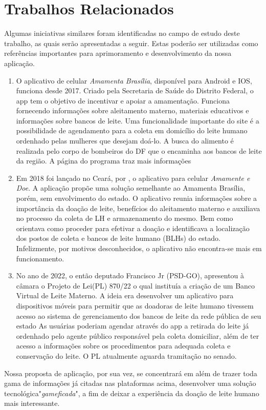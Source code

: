 \chapter{Trabalhos Relacionados}

Algumas iniciativas similares foram identificadas no campo de estudo deste trabalho, as quais serão apresentadas a seguir. Estas poderão ser utilizadas como referências importantes para aprimoramento e desenvolvimento da nossa aplicação.\\
\begin{enumerate}
    \item O aplicativo de celular \emph{Amamenta Brasília}, disponível para Android e IOS, funciona desde 2017. Criado pela Secretaria de Saúde do Distrito Federal, o app tem o objetivo de incentivar e apoiar a amamentação. Funciona fornecendo informações sobre aleitamento materno, materiais educativos e informações sobre bancos de leite. Uma funcionalidade importante do site é a possibilidade de agendamento para a coleta em domicílio do leite humano ordenhado pelas mulheres que desejam doá-lo. A busca do alimento é realizada pelo corpo de bombeiros do DF que o encaminha aos bancos de leite da região. A página do programa \cite{amamentabrasilia} traz mais informações
    \item Em 2018 foi lançado no Ceará, por  \cite{Carvalho}, o aplicativo para celular \emph{Amamente e Doe}. A aplicação propõe uma solução semelhante ao Amamenta Brasília, porém, sem envolvimento do estado. O aplicativo reunia informações sobre a importância da doação de leite, benefícios do aleitamento materno e auxiliava no processo da coleta de LH e armazenamento do mesmo. Bem como orientava como proceder para efetivar a doação e identificava a localização dos postos de coleta e bancos de leite humano (BLHs) do estado. Infelizmente, por motivos desconhecidos, o aplicativo não encontra-se mais em funcionamento.
    \item No ano de 2022, o então deputado Francisco Jr (PSD-GO), apresentou à câmara o Projeto de Lei(PL) 870/22 o qual instituía a criação de um Banco Virtual de Leite Materno. A ideia era desenvolver um aplicativo para dispositivos móveis para permitir que as doadoras de leite humano tivessem acesso ao sistema de gerenciamento dos bancos de leite da rede pública de seu estado As usuárias poderiam agendar através do app a retirada do leite já ordenhado pelo agente público responsável pela coleta domiciliar, além de ter acesso a informações sobre os procedimentos para adequada coleta e conservação do leite. O PL \cite{PL870/2022} atualmente aguarda tramitação no senado.
\end{enumerate}

Nossa proposta de aplicação, por sua vez, se concentrará em além de trazer toda gama de informações já citadas nas plataformas acima, desenvolver uma solução tecnológica"\textit{gameficada}", a fim de deixar a experiência da doação de leite humano mais interessante.




